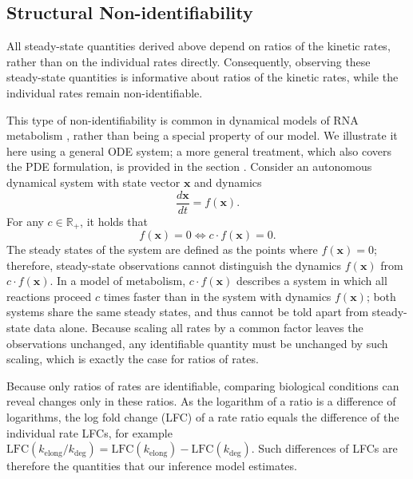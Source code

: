 \documentclass[11pt]{article}
\begin{document}
    

    \subsection{Structural Non-identifiability} \label{subsec:structural_nonidef}
    
    All steady-state quantities derived above depend on ratios of the kinetic rates, rather than on the individual rates directly. Consequently, observing these steady-state quantities is informative about ratios of the kinetic rates, while the individual rates remain non-identifiable.

    This type of non-identifiability is common in dynamical models of RNA metabolism \citep{furlanDynamicsTranscriptionalPosttranscriptional2021}, rather than being a special property of our model. We illustrate it here using a general ODE system; a more general treatment, which also covers the PDE formulation, is provided in the section . Consider an autonomous dynamical system with state vector $\boldsymbol{x}$ and dynamics
    \begin{equation} \label{eq:autonomous_ode}
    \frac{d\boldsymbol{x}}{dt} = f(\boldsymbol{x}).
    \end{equation}
    For any $c \in \mathbb{R}_+$, it holds that
    \begin{equation} \label{eq:scaling_invariance}
    f(\boldsymbol{x}) = 0 \Leftrightarrow c \cdot f(\boldsymbol{x}) = 0.
    \end{equation}
    The steady states of the system are defined as the points where $f(\boldsymbol{x}) = 0$; therefore, steady-state observations cannot distinguish the dynamics $f(\boldsymbol{x})$ from $c \cdot f(\boldsymbol{x})$. In a model of metabolism, $c \cdot f(\boldsymbol{x})$ describes a system in which all reactions proceed $c$ times faster than in the system with dynamics $f(\boldsymbol{x})$; both systems share the same steady states, and thus cannot be told apart from steady-state data alone. Because scaling all rates by a common factor leaves the observations unchanged, any identifiable quantity must be unchanged by such scaling, which is exactly the case for ratios of rates.

    Because only ratios of rates are identifiable, comparing biological conditions can reveal changes only in these ratios. As the logarithm of a ratio is a difference of logarithms, the log fold change (LFC) of a rate ratio equals the difference of the individual rate LFCs, for example $\mathrm{LFC}(k_{\mathrm{elong}} / k_{\mathrm{deg}}) = \mathrm{LFC}(k_{\mathrm{elong}}) - \mathrm{LFC}(k_{\mathrm{deg}})$. Such differences of LFCs are therefore the quantities that our inference model estimates.
\end{document}
